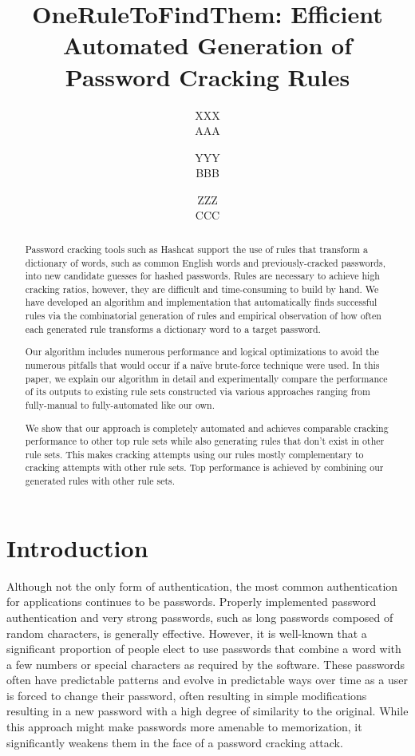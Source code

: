 \documentclass[letterpaper,twocolumn,10pt]{article}
\begin{document}
\date{}

\title{\Large \bf OneRuleToFindThem: Efficient Automated Generation of Password Cracking Rules}

\author{
{\rm XXX}\\
AAA
\and
{\rm YYY}\\
BBB
\and
{\rm ZZZ}\\
CCC
}

\maketitle

\begin{abstract}
Password cracking tools such as Hashcat support the use of rules that transform
a dictionary of words, such as common English words and previously-cracked
passwords, into new candidate guesses for hashed passwords. Rules are necessary
to achieve high cracking ratios, however, they are difficult and time-consuming
to build by hand. We have developed an algorithm and implementation that
automatically finds successful rules via the combinatorial generation of rules
and empirical observation of how often each generated rule transforms a
dictionary word to a target password.

Our algorithm includes numerous performance and logical optimizations to avoid the
numerous pitfalls that would occur if a na\"ive brute-force technique were used.
In this paper, we explain our algorithm in detail and experimentally compare the
performance of its outputs to existing rule sets constructed via various
approaches ranging from fully-manual to fully-automated like our own.

We show that our approach is completely automated and achieves comparable
cracking performance to other top rule sets while also generating rules that
don't exist in other rule sets. This makes cracking attempts using our rules
mostly complementary to cracking attempts with other rule sets. Top performance is achieved by combining our generated rules with other rule sets.
\end{abstract}

\section{Introduction}

Although not the only form of authentication, the most common 
authentication for applications continues to be passwords. Properly implemented password
authentication and very strong passwords,
such as long passwords composed of random characters, is
generally effective. However, it is well-known that a significant proportion of
people elect to use passwords that combine a word with a few numbers or
special characters as required by the software. These passwords often
have predictable patterns and evolve in predictable ways over time as a user is
forced to change their password, often resulting in simple modifications
resulting in a new password with a high degree of similarity to the
original.\cite{hanamsagar2018leveraging} While this approach might make
passwords more amenable to memorization, it significantly weakens them in the
face of a password cracking attack.
\end{document}
